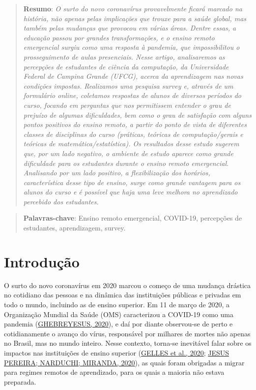 \documentclass[
  12pt,
  portuguese,
]{article}
\begin{document}
\begin{quote}
\textbf{Resumo}: \emph{O surto do novo coronavírus provavelmente ficará
marcado na história, não apenas pelas implicações que trouxe para a
saúde global, mas também pelas mudanças que provocou em várias áreas.
Dentre essas, a educação passou por grandes transformações, e o ensino
remoto emergencial surgiu como uma resposta à pandemia, que
impossibilitou o prosseguimento de aulas presenciais. Nesse artigo,
analisaremos as percepções de estudantes de ciência da computação, da
Universidade Federal de Campina Grande (UFCG), acerca da aprendizagem
nas novas condições impostas. Realizamos uma pesquisa survey e, através
de um formulário online, coletamos respostas de alunos de diversos
períodos do curso, focando em perguntas que nos permitissem entender o
grau de prejuízo de algumas dificuldades, bem como o grau de satisfação
com alguns pontos positivos do ensino remoto, a partir do ponto de vista
de diferentes classes de disciplinas do curso (práticas, teóricas de
computação/gerais e teóricas de matemática/estatística). Os resultados
desse estudo sugerem que, por um lado negativo, o ambiente de estudo
aparece como grande dificuldade para os estudantes durante o ensino
remoto emergencial. Analisando por um lado positivo, a flexibilização
dos horários, característica desse tipo de ensino, surge como grande
vantagem para os alunos do curso e é possível que haja uma leve melhora
no aprendizado percebido dos estudantes.}
\end{quote}

\begin{quote}
\textbf{Palavras-chave}: Ensino remoto emergencial, COVID-19, percepções
de estudantes, aprendizagem, survey.
\end{quote}


\hypertarget{introduuxe7uxe3o}{%
\section{Introdução}\label{introduuxe7uxe3o}}

O surto do novo coronavírus em 2020 marcou o começo de uma mudança
drástica no cotidiano das pessoas e na dinâmica das instituições
públicas e privadas em todo o mundo, incluindo as de ensino superior. Em
11 de março de 2020, a Organização Mundial da Saúde (OMS) caracterizou a
COVID-19 como uma pandemia (\protect\hyperlink{ref-who}{GHEBREYESUS,
2020}), e daí por diante observou-se de perto e cotidianamente o avanço
do vírus, responsável por milhares de mortes não apenas no Brasil, mas
no mundo inteiro. Nesse contexto, torna-se inevitável falar sobre os
impactos nas instituições de ensino superior
(\protect\hyperlink{ref-compassionate}{GELLES et al., 2020};
\protect\hyperlink{ref-biopolitica}{JESUS PEREIRA; NARDUCHI; MIRANDA,
2020}), as quais foram obrigadas a migrar para regimes remotos de
aprendizado, para os quais a maioria não estava preparada.
\end{document}
